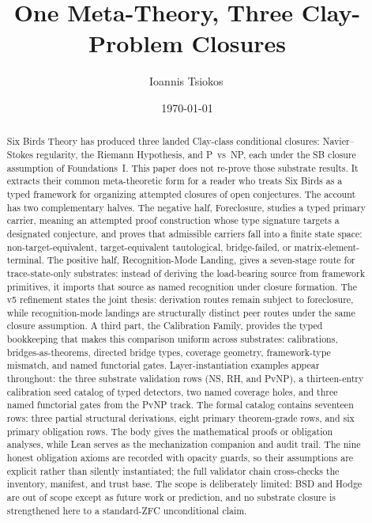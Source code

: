\documentclass[11pt]{article}
\title{One Meta-Theory, Three Clay-Problem Closures}
\author{Ioannis Tsiokos\,\orcidlink{0009-0009-7659-5964}}
\date{\today}
\theoremstyle{definition}
\begin{document}
\maketitle
\thispagestyle{firstpage}

\begin{abstract}
Six Birds Theory has produced three landed Clay-class conditional
closures: Navier--Stokes regularity, the Riemann Hypothesis, and
P~vs~NP, each under the SB closure assumption of Foundations~I.  This
paper does not re-prove those substrate results.  It extracts their
common meta-theoretic form for a reader who treats Six Birds as a
typed framework for organizing attempted closures of open conjectures.
The account has two complementary halves.  The negative half,
Foreclosure, studies a typed primary carrier, meaning an attempted
proof construction whose type signature targets a designated
conjecture, and proves that admissible carriers fall into a finite
state space: non-target-equivalent, target-equivalent tautological,
bridge-failed, or matrix-element-terminal.  The positive half,
Recognition-Mode Landing, gives a seven-stage route for
trace-state-only substrates: instead of deriving the load-bearing
source from framework primitives, it imports that source as named
recognition under closure formation.  The v5 refinement states the
joint thesis: derivation routes remain subject to foreclosure, while
recognition-mode landings are structurally distinct peer routes under
the same closure assumption.  A third part, the Calibration Family,
provides the typed bookkeeping that makes this comparison uniform
across substrates: calibrations, bridges-as-theorems, directed bridge
types, coverage geometry, framework-type mismatch, and named
functorial gates.  Layer-instantiation examples appear throughout: the
three substrate validation rows (NS, RH, and PvNP), a thirteen-entry
calibration seed catalog of typed detectors, two named coverage holes,
and three named functorial gates from the PvNP track.  The formal
catalog contains seventeen rows: three partial structural derivations,
eight primary theorem-grade rows, and six primary obligation rows.  The body gives the mathematical proofs or
obligation analyses, while Lean serves as the mechanization companion
and audit trail.  The nine honest obligation axioms are
recorded with opacity guards, so their assumptions are explicit rather
than silently instantiated; the full validator chain cross-checks the
inventory, manifest, and trust base.  The scope is deliberately
limited: BSD and Hodge are out of scope except as future work or
prediction, and no substrate closure is strengthened here to a
standard-ZFC unconditional claim.
\end{abstract}
\end{document}
